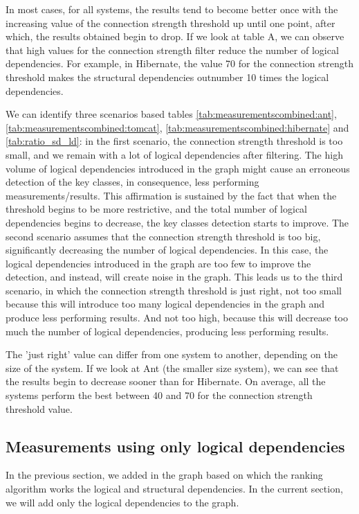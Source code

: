 \documentclass[runningheads]{comsis2}
\begin{document}
In most cases, for all systems, the results tend to become better once with the increasing value of the connection strength threshold up until one point, after which, the results obtained begin to drop.
If we look at table A, we can observe that high values for the connection strength filter reduce the number of logical dependencies. For example, in Hibernate, the value 70 for the connection strength threshold makes the structural dependencies outnumber 10 times the logical dependencies. 

We can identify three scenarios based tables \ref{tab:measurementscombined:ant}, \ref{tab:measurementscombined:tomcat}, \ref{tab:measurementscombined:hibernate} and \ref{tab:ratio_sd_ld}: in the first scenario, the connection strength threshold is too small, and we remain with a lot of logical dependencies after filtering. The high volume of logical dependencies introduced in the graph might cause an erroneous detection of the key classes, in consequence, less performing measurements/results. This affirmation is sustained by the fact that 
when the threshold begins to be more restrictive, and the total number of logical dependencies begins to decrease, the key classes detection starts to improve.
The second scenario assumes that the connection strength threshold is too big, significantly decreasing the number of logical dependencies.
In this case, the logical dependencies introduced in the graph are too few to improve the detection, and instead, will create noise in the graph.
This leads us to the third scenario, in which the connection strength threshold is just right, not too small because this will introduce too many logical dependencies in the graph and produce less performing results. And not too high, because this will decrease too much the number of logical dependencies, producing less performing results. 

The 'just right' value can differ from one system to another, depending on the size of the system. If we look at Ant (the smaller size system), we can see that the results begin to decrease sooner than for Hibernate. On average, all the systems perform the best between 40 and 70 for the connection strength threshold value.




\subsection{Measurements using only logical dependencies}
\label{sec:measure_ld}
In the previous section, we added in the graph based on which the ranking algorithm works the logical and structural dependencies. In the current section, we will add only the logical dependencies to the graph.
\end{document}
